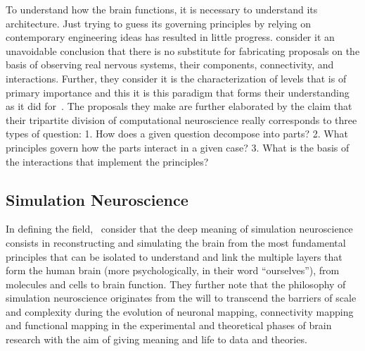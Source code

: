 \documentclass[11pt,3p,twocolumn]{JMN}
\begin{document}
To understand how the brain functions, it is necessary to understand its architecture. Just trying to guess its governing principles by relying on contemporary engineering ideas has resulted in little progress. \citet*{Churchland:1992uq} consider it an unavoidable conclusion that there is no substitute for fabricating proposals on the basis of observing real nervous systems, their components, connectivity, and interactions. Further, they consider it is the characterization of levels that is of primary importance and this it is this paradigm that forms their understanding as it did for~\citet{Marr:1982fk}. The proposals they make are further elaborated by the claim that their tripartite division of computational neuroscience really corresponds to three types of question: 1. How does a given question decompose into parts? 2. What principles govern how the parts interact in a given case? 3. What is the basis of the interactions that implement the principles?

\subsection{Simulation Neuroscience}
\label{subsection:simneuro}

In defining the field,~\citet{fan19} consider that the deep meaning of simulation neuroscience consists in reconstructing and simulating the brain from the most fundamental principles that can be isolated to understand and link the multiple layers that form the human brain (more psychologically, in their word ``ourselves''), from molecules and cells to brain function. They further note that the philosophy of simulation neuroscience originates from the will to transcend the barriers of scale and complexity during the evolution of neuronal mapping, connectivity mapping and functional mapping in the experimental and theoretical phases of brain research with the aim of giving meaning and life to data and theories.
\end{document}
